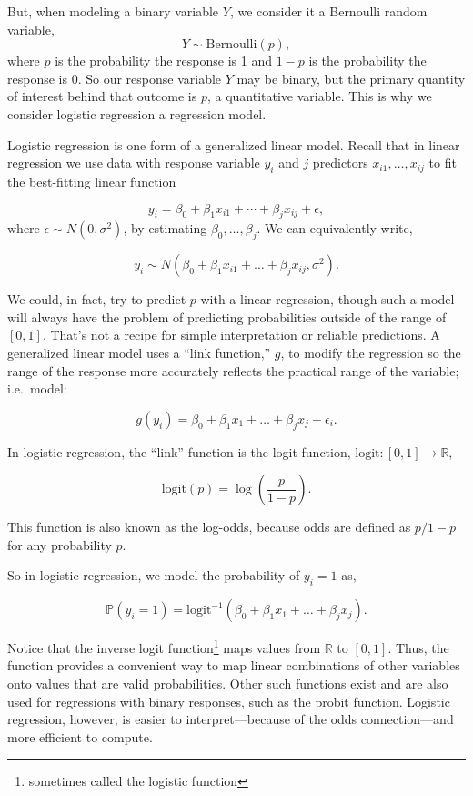 \documentclass[12pt,twoside]{reedthesis}
\begin{document}
  But, when modeling a binary variable \(Y\), we consider it a Bernoulli
  random variable, \[Y \sim \text{Bernoulli}(p),\] where \(p\) is the
  probability the response is 1 and \(1-p\) is the probability the
  response is 0. So our response variable \(Y\) may be binary, but the
  primary quantity of interest behind that outcome is \(p\), a
  quantitative variable. This is why we consider logistic regression a
  regression model.
  
  Logistic regression is one form of a generalized linear model. Recall
  that in linear regression we use data with response variable \(y_i\) and
  \(j\) predictors \(x_{i1}, \ldots, x_{ij}\) to fit the best-fitting
  linear function
  
  \[y_i = \beta_0 + \beta_1 x_{i1} + \cdots + \beta_j x_{ij} + \epsilon,\]
  where \(\epsilon \sim N(0, \sigma^2)\), by estimating
  \(\beta_0, \ldots, \beta_j\). We can equivalently write,
  
  \[y_i \sim N(\beta_0 + \beta_1 x_{i1} + \ldots + \beta_j x_{ij}, \sigma^2).\]
  
  We could, in fact, try to predict \(p\) with a linear regression, though
  such a model will always have the problem of predicting probabilities
  outside of the range of \([0, 1]\). That's not a recipe for simple
  interpretation or reliable predictions. A generalized linear model uses
  a ``link function,'' \(g\), to modify the regression so the range of the
  response more accurately reflects the practical range of the variable;
  i.e.~model:
  
  \[g(y_i) = \beta_0 + \beta_1 x_1 + \ldots + \beta_j x_j + \epsilon_i.\]
  
  In logistic regression, the ``link'' function is the logit function,
  \(\text{logit}:[0,1] \to \mathbb{R}\),
  
  \[\text{logit} (p) = \log \left(\frac{p}{1-p}\right). \]
  
  This function is also known as the log-odds, because odds are defined as
  \(p/1-p\) for any probability \(p\).
  
  So in logistic regression, we model the probability of \(y_i = 1\) as,
  
  \[\mathbb{P} (y_i = 1) = \text{logit}^{-1} (\beta_0 + \beta_1 x_1 + \ldots + \beta_j x_j).\]
  
  Notice that the inverse logit function\footnote{sometimes called the
    logistic function} maps values from \(\mathbb{R}\) to \([0,1]\). Thus,
  the function provides a convenient way to map linear combinations of
  other variables onto values that are valid probabilities. Other such
  functions exist and are also used for regressions with binary responses,
  such as the probit function. Logistic regression, however, is easier to
  interpret---because of the odds connection---and more efficient to
  compute.
  
\end{document}
